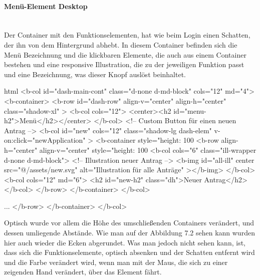\paragraph{Menü-Element Desktop}
~\\
Der Container mit den Funktionselementen, hat wie beim Login einen Schatten, der ihn von dem Hintergrund abhebt. In diesem Container befinden sich die Menü Bezeichnung und die klickbaren Elemente, die auch aus einem Container bestehen und eine responsive Illustration, die zu der jeweiligen Funktion passt und eine Bezeichnung, was dieser Knopf auslöst beinhaltet.
\begin{code}{html}
<b-col id="dash-main-cont" class="d-none d-md-block" cols="12" md="4">
	<b-container>
		<b-row
			id="dash-row"
			align-v="center"
			align-h="center"
			class="shadow-xl"
		>
			<b-col cols="12">
				<center><h2 id="menu-h2">Menü</h2></center>
			</b-col>
			<!-- Custom Button für einen neuen Antrag -->
			<b-col
				id="new"
				cols="12"
				class="shadow-lg dash-elem"
				v-on:click="newApplication"
			>
				<b-container style="height: 100%
					<b-row align-h="center" align-v="center" style="height: 100%
						<b-col cols="6" class="ill-wrapper d-none d-md-block">
						<!-- Illustration neuer Antrag -->
							<b-img
								id="all-ill"
								center
								src="@/assets/new.svg"
								alt="Illustration für alle Anträge"
							></b-img>
						</b-col>
						<b-col cols="12" md="6">
							<h2 id="new-h2" class="dh">Neuer Antrag</h2>
						</b-col>
					</b-row>
				</b-container>
			</b-col>
			
			...
		</b-row>
	</b-container>
</b-col>
\end{code}
Optisch wurde vor allem die Höhe des umschließenden Containers verändert, und dessen umliegende Abstände. Wie man auf der Abbildung 7.2 sehen kann wurden hier auch wieder die Ecken abgerundet. Was man jedoch nicht sehen kann, ist, dass sich die Funktionselemente, optisch absenken und der Schatten entfernt wird und die Farbe verändert wird, wenn man mit der Maus, die sich zu einer zeigenden Hand verändert, über das Element fährt. 
